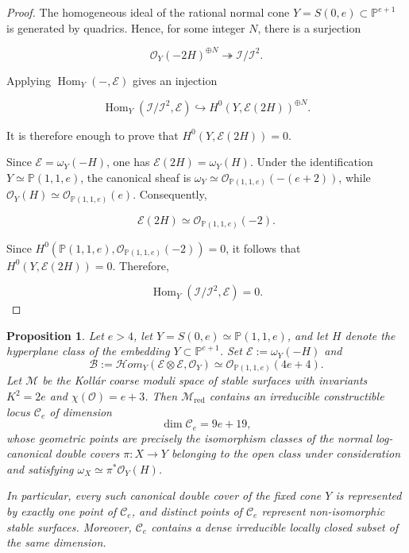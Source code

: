 \documentclass[11pt,twoside]{amsart}
\theoremstyle{plain}
\numberwithin{equation}{section}
\newtheorem{proposition}[theorem]{Proposition}
\theoremstyle{definition}
\begin{document}
\begin{proof}
The homogeneous ideal of the rational normal cone $Y=S(0,e)\subset\mathbb P^{e+1}$ is generated by quadrics. Hence, for some integer $N$, there is a surjection

$$
\mathcal O_Y(-2H)^{\oplus N}\twoheadrightarrow\mathcal I/\mathcal I^2.
$$

Applying $\operatorname{Hom}_Y(-,\mathcal E)$ gives an injection

$$
\operatorname{Hom}_Y(\mathcal I/\mathcal I^2,\mathcal E)
\hookrightarrow
H^0(Y,\mathcal E(2H))^{\oplus N}.
$$

It is therefore enough to prove that $H^0(Y,\mathcal E(2H))=0$.

Since $\mathcal E=\omega_Y(-H)$, one has $\mathcal E(2H)=\omega_Y(H)$. Under the identification $Y\simeq\mathbb P(1,1,e)$, the canonical sheaf is $\omega_Y\simeq\mathcal O_{\mathbb P(1,1,e)}(-(e+2))$, while $\mathcal O_Y(H)\simeq\mathcal O_{\mathbb P(1,1,e)}(e)$. Consequently,

$$
\mathcal E(2H)
\simeq
\mathcal O_{\mathbb P(1,1,e)}(-2).
$$

Since $H^0(\mathbb P(1,1,e),\mathcal O_{\mathbb P(1,1,e)}(-2))=0$, it follows that $H^0(Y,\mathcal E(2H))=0$. Therefore,

$$
\operatorname{Hom}_Y(\mathcal I/\mathcal I^2,\mathcal E)=0.
$$

\end{proof}

\begin{proposition}\label{prop:canonical-double-cover-locus}
Let $e>4$, let $Y=S(0,e)\simeq\mathbb P(1,1,e)$, and let $H$ denote the hyperplane class of the embedding $Y\subset\mathbb P^{e+1}$. Set $\mathcal E:=\omega_Y(-H)$ and
$$
\mathcal B:=\mathcal H om_Y(\mathcal E\otimes\mathcal E,\mathcal O_Y)
\simeq\mathcal O_{\mathbb P(1,1,e)}(4e+4).
$$
Let $\mathcal M$ be the Kollár coarse moduli space of stable surfaces with invariants $K^2=2e$ and $\chi(\mathcal O)=e+3$. Then $\mathcal M_{\mathrm{red}}$ contains an irreducible constructible locus $\mathcal C_e$ of dimension
$$
\dim\mathcal C_e=9e+19,
$$
whose geometric points are precisely the isomorphism classes of the normal log-canonical double covers $\pi:X\to Y$ belonging to the open class under consideration and satisfying $\omega_X\simeq\pi^*\mathcal O_Y(H)$.

In particular, every such canonical double cover of the fixed cone $Y$ is represented by exactly one point of $\mathcal C_e$, and distinct points of $\mathcal C_e$ represent non-isomorphic stable surfaces. Moreover, $\mathcal C_e$ contains a dense irreducible locally closed subset of the same dimension.
\end{proposition}
\end{document}
